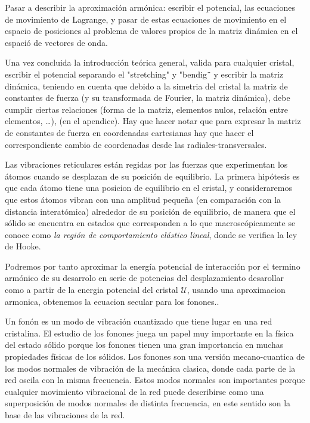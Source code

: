 \documentclass[12pt,a4paper]{article}
\begin{document}
Pasar a describir la aproximación armónica: escribir el potencial, las ecuaciones de movimiento de Lagrange, y pasar de estas ecuaciones de movimiento en el espacio de posiciones al problema de valores propios de la matriz dinámica en el espació de vectores de onda.

Una vez concluida la introducción teórica general, valida para cualquier cristal, escribir el potencial separando el "stretching" y "bendig¨ y escribir la matriz dinámica, teniendo en cuenta que debido a la simetria del cristal la matriz de constantes de fuerza (y su transformada de Fourier, la matriz dinámica), debe cumplir ciertas relaciones (forma de la matriz, elementos nulos, relación entre elementos, \ldots{}), \cite{aizawa90_bond_soften_monol_graph_formed} (en el apendice). Hay que hacer notar que para expresar la matriz de constantes de fuerza en coordenadas cartesianas hay que hacer el correspondiente cambio de coordenadas desde las radiales-transversales.


\normalcolor

Las vibraciones reticulares están regidas por las fuerzas que experimentan los átomos cuando se desplazan de su posición de equilibrio. La primera hipótesis es que cada átomo tiene una posicion de equilibrio en el cristal, y consideraremos que estos átomos vibran con una amplitud pequeña (en comparación con la distancia interatómica) alrededor de su posición de equilibrio, de manera que el sólido se encuentra en estados que corresponden a lo que macroscópicamente se conoce como \emph{la región de comportamiento elástico lineal}, donde se verifica la ley de Hooke.

Podremos por tanto aproximar la energía potencial de interacción por el termino armónico de su desarrolo en serie de potencias del desplazamiento \color{red} desarollar como a partir de la energia potencial del cristal \(\mathcal{U}\), usando una aproximacion armonica, obtenemos la ecuacion secular para los fonones.\normalcolor.

Un fonón es un modo de vibración cuantizado que tiene lugar en una red cristalina. El estudio de los fonones juega un papel muy importante en la física del estado sólido porque los fonones tienen una gran importancia en muchas propiedades físicas de los sólidos. Los fonones son una versión mecano-cuantica de los modos normales de vibración de la mecánica clasica, donde cada parte de la red oscila con la misma frecuencia. Estos modos normales son importantes porque cualquier movimiento vibracional de la red puede describirse como una superposición de modos normales de distinta frecuencia, en este sentido son la base de las vibraciones de la red.
\end{document}
